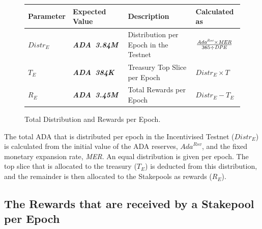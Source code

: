 \documentclass[11pt,a4paper,dvipsnames,twosided,final]{article}
\newcommand{\ada}{ADA{}}
\newcommand{\ADA}[1]{\textbf{\emph{\ada~{#1}}}}
\begin{document}
\begin{figure}[h!]
\begin{center}
\begin{tabular}{||l|l|p{6cm}|l||}
  \hline \hline
\textbf{Parameter} & \textbf{Expected Value} & \textbf{Description} & \textbf{Calculated as} \\\hline
$\textit{Distr}_E$ & \ADA{3.84M} & Distribution per Epoch in the Testnet & $\frac{\large \textit{Ada}^{\textit{Rsv}} \times \textit{MER}}{\large 365 \div \textit{DPE}}$ \\\hline
$T_E$ & \ADA{384K} & Treasury Top Slice per Epoch & $\textit{Distr}_E \times T$ \\\hline
$R_E$ & \ADA{3.45M} & Total Rewards per Epoch & $\textit{Distr}_E - T_E$ \\\hline
  \hline
\end{tabular}
\end{center}
\caption{Total Distribution and Rewards per Epoch.}
\label{fig:distrib}
\end{figure}

\noindent
The total \ada{} that is distributed per epoch in the Incentivised Testnet (${\textit{Distr}}_E$) is calculated from the initial
value of the \ada{} reserves, $\textit{Ada}^{\textit{Rsv}}$, and the fixed monetary expansion rate, \textit{MER}.
An equal distribution is given per epoch.  The top slice that is allocated to the treasury ($T_E$) is
deducted from this distribution, and the remainder is then allocated to the Stakepools as rewards ($R_E$).

\subsection{The Rewards that are received by a Stakepool per Epoch}
\end{document}
